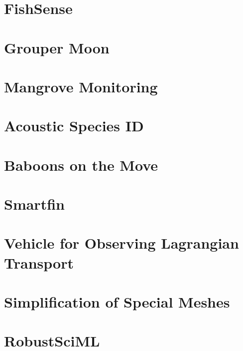 \section{FishSense}

\section{Grouper Moon}

\section{Mangrove Monitoring}

\section{Acoustic Species ID}

\section{Baboons on the Move}

\section{Smartfin}

\section{Vehicle for Observing Lagrangian Transport}

\section{Simplification of Special Meshes}

\section{RobustSciML}

